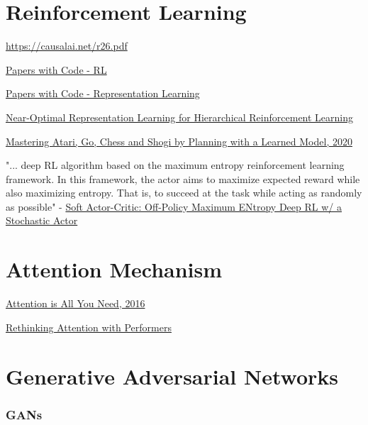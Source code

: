 \chapter{Reinforcement Learning}

\cite{sorokin2015deep}




\url{https://causalai.net/r26.pdf}

\href{https://paperswithcode.com/methods/area/reinforcement-learning}{Papers with Code - RL}

\href{https://paperswithcode.com/task/representation-learning}{Papers with Code - Representation Learning}

\href{https://paperswithcode.com/paper/near-optimal-representation-learning-for}{	Near-Optimal Representation Learning for Hierarchical Reinforcement Learning}

\href{https://arxiv.org/pdf/1911.08265.pdf}{Mastering Atari, Go, Chess and Shogi by Planning with a Learned Model, 2020}

"... deep RL algorithm based on the
maximum entropy reinforcement learning framework. In this framework, the actor aims to maximize expected reward while also maximizing entropy. That is, to succeed at the task while acting as randomly as possible" - \href{https://arxiv.org/pdf/1801.01290.pdf}{Soft Actor-Critic: Off-Policy Maximum ENtropy Deep RL w/ a Stochastic Actor} 


\chapter{Attention Mechanism}




\href{https://proceedings.neurips.cc/paper/2017/file/3f5ee243547dee91fbd053c1c4a845aa-Paper.pdf}{Attention is All You Need, 2016}

\href{https://arxiv.org/pdf/2009.14794.pdf}{Rethinking Attention with Performers}





\chapter{Generative Adversarial Networks}



\subsection{GANs \cite{goodfellow2014generative}}

